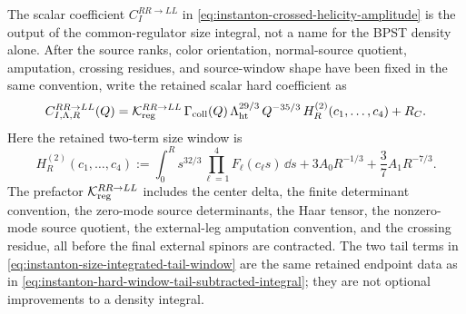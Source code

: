 \begin{controlledapproximation}
\label{ca:instanton-size-integrated-crossed-hard-channel}
The scalar coefficient \(C_I^{RR\to LL}\) in
\eqref{eq:instanton-crossed-helicity-amplitude} is the output of the
common-regulator size integral, not a name for the BPST density alone.  After
the source ranks, color orientation, normal-source quotient, amputation,
crossing residues, and source-window shape have been fixed in the same
convention, write the retained scalar hard coefficient as
\begin{equation}
  C_{I,\Lambda,R}^{RR\to LL}(Q)
  =
  \mathcal K_{\rm reg}^{RR\to LL}\,
  \Gamma_{\rm coll}(Q)\,
  \Lambda_{\rm ht}^{29/3}\,
  Q^{-35/3}\,
  H_R^{(2)}(c_1,\ldots,c_4)
  +R_C.
  \label{eq:instanton-size-integrated-crossed-coefficient}
\end{equation}
Here the retained two-term size window is
\begin{equation}
  H_R^{(2)}(c_1,\ldots,c_4)
  :=
  \int_0^R
    s^{32/3}\prod_{\ell=1}^{4}F_\ell(c_\ell s)\,\dd s
  +3A_0R^{-1/3}
  +\frac37A_1R^{-7/3}.
  \label{eq:instanton-size-integrated-tail-window}
\end{equation}
The prefactor \(\mathcal K_{\rm reg}^{RR\to LL}\) includes the center
delta, the finite determinant convention, the zero-mode source determinants,
the Haar tensor, the nonzero-mode source quotient, the external-leg
amputation convention, and the crossing residue, all before the final
external spinors are contracted.  The two tail terms in
\eqref{eq:instanton-size-integrated-tail-window} are the same retained
endpoint data as in
\eqref{eq:instanton-hard-window-tail-subtracted-integral}; they are not
optional improvements to a density integral.


\end{controlledapproximation}

